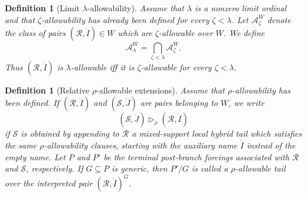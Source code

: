 \documentclass[a4paper,11pt]{article}
\newtheorem{definition}[theorem]{Definition}
\begin{document}
\begin{definition}[Limit \(\lambda\)-allowability]
\label{def:limit-lambda-allowable-local}
Assume that \(\lambda\) is a nonzero limit ordinal and that
\(\zeta\)-allowability has already been defined for every \(\zeta<\lambda\).
Let \(\mathcal A^W_\zeta\) denote the class of pairs
\((\mathcal R,\dot I)\in W\) which are \(\zeta\)-allowable over \(W\).  We define
\[
   \mathcal A^W_\lambda
   =
   \bigcap_{\zeta<\lambda}\mathcal A^W_\zeta.
\]
Thus \((\mathcal R,\dot I)\) is \emph{\(\lambda\)-allowable} iff it is
\(\zeta\)-allowable for every \(\zeta<\lambda\).  
\end{definition}

\begin{definition}[Relative \(\rho\)-allowable extensions]
\label{def:relative-rho-allowable-local}
Assume that \(\rho\)-allowability has been defined.  If
\((\mathcal R,\dot I)\) and \((\mathcal S,\dot J)\) are pairs belonging to
\(W\), we write
\[
   (\mathcal S,\dot J)\triangleright_\rho(\mathcal R,\dot I)
\]
if \(\mathcal S\) is obtained by appending to \(\mathcal R\) a mixed-support local
hybrid tail which satisfies the same \(\rho\)-allowability clauses, starting
with the auxiliary name \(\dot I\) instead of the empty name.  Let \(P\) and
\(P'\) be the terminal post-branch forcings associated with \(\mathcal R\) and
\(\mathcal S\), respectively.  If \(G\subseteq P\) is generic, then \(P'/G\) is
called a \emph{\(\rho\)-allowable tail} over the interpreted pair
\((\mathcal R,\dot I)^G\). 
\end{definition}
\end{document}
